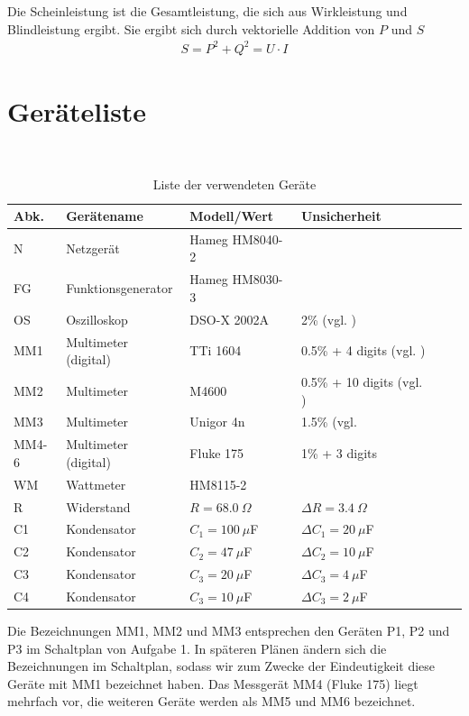 \documentclass{article}
\begin{document}
Die Scheinleistung ist die Gesamtleistung, die sich aus Wirkleistung und Blindleistung ergibt. Sie ergibt sich durch vektorielle Addition von $P$ und $S$
\begin{align}
S = P^2 + Q^2 = U\cdot I 
\end{align}




\section{Geräteliste}

\begin{table}[H]
\caption{Liste der verwendeten Geräte}

~

\begin{tabular}{l|p{2.3cm}p{3cm}lll}
Abk. & Gerätename    &  Modell/Wert  & Unsicherheit\\
\hline
N & Netzgerät & Hameg HM8040-2 \\
FG & Funktions\-generator & Hameg HM8030-3 \\
OS & Oszilloskop & DSO-X 2002A  & 2\% (vgl. \cite{oszi_datenblatt}) \\
MM1 & Multimeter (digital) & TTi 1604 & 0.5\% + 4 digits (vgl. \cite{moodle})\\
MM2 & Multimeter & M4600 & 0.5\% + 10 digits (vgl. \cite{moodle}) \\
MM3 & Multimeter & Unigor 4n & 1.5\% (vgl. \cite{moodle} \\
MM4-6 & Multimeter (digital) & Fluke 175 & 1\% + 3 digits \\
WM & Wattmeter & HM8115-2 \\
R & Widerstand & $R=68.0~\Omega$ & $\Delta R = 3.4~\Omega$ \\
C1 & Kondensator & $C_1=100~\mu$F & $\Delta C_1 = 20~\mu$F \\
C2 & Kondensator & $C_2=47~\mu$F & $\Delta C_2 = 10~\mu$F \\
C3 & Kondensator & $C_3=20~\mu$F & $\Delta C_3 = 4~\mu$F \\
C4 & Kondensator & $C_3=10~\mu$F & $\Delta C_3 = 2~\mu$F \\
\end{tabular}
\end{table}

Die Bezeichnungen MM1, MM2 und MM3 entsprechen den Geräten P1, P2 und P3 im Schaltplan von Aufgabe 1. In späteren Plänen ändern sich die Bezeichnungen im Schaltplan, sodass wir zum Zwecke der Eindeutigkeit diese Geräte mit MM1 bezeichnet haben. Das Messgerät MM4 (Fluke 175) liegt mehrfach vor, die weiteren Geräte werden als MM5 und MM6 bezeichnet.
\end{document}
